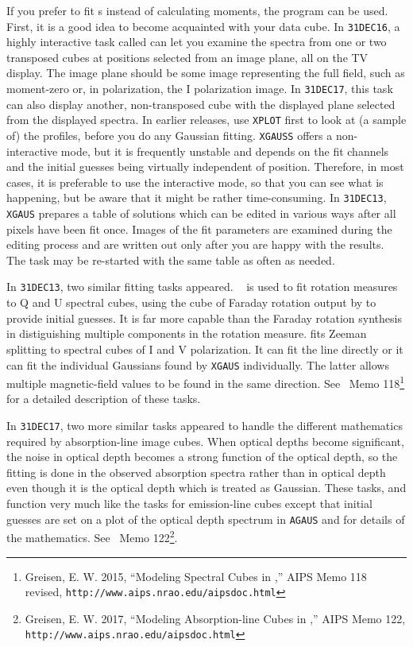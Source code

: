     If you prefer to fit s instead of calculating
moments, the program {\tt {}} can be used. First, it is a
good idea to become acquainted with your data cube.  In {\tt 31DEC16},
a highly interactive task called {\tt {}} can let you
examine the spectra from one or two transposed cubes at positions
selected from an image plane, all on the TV display.  The image plane
should be some image representing the full field, such as moment-zero
or, in polarization, the I polarization image.  In {\tt 31DEC17}, this
task can also display another, non-transposed cube with the displayed
plane selected from the displayed spectra.  In earlier releases, use
{\tt XPLOT} first to look at (a sample of) the profiles, before you do
any Gaussian fitting.  {\tt XGAUSS} offers a non-interactive mode, but
it is frequently unstable and depends on the fit channels and the
initial guesses being virtually independent of position.  Therefore,
in most cases, it is preferable to use the interactive mode, so that
you can see what is happening, but be aware that it might be rather
time-consuming.  In {\tt 31DEC13}, {\tt XGAUS} prepares
a table of solutions which can be edited in various ways after all
pixels have been fit once.  Images of the fit parameters are examined
during the editing process and are written out only after you are
happy with the results.  The task may be re-started with the same
table as often as needed.

     In {\tt 31DEC13}, two similar fitting tasks appeared.  {\tt
{}} is used to fit rotation measures to Q and U spectral
cubes, using the cube of Faraday rotation output by {\tt {}}
to provide initial guesses.  It is far more capable than the Faraday
rotation synthesis in distiguishing multiple components in the
rotation measure.  {\tt {}} fits Zeeman splitting to
spectral cubes of I and V polarization.  It can fit the line directly
or it can fit the individual Gaussians found by {\tt XGAUS}
individually.  The latter allows multiple magnetic-field values to be
found in the same direction.  See \AIPS\ Memo 118\footnote{Greisen, E.
W. 2015, ``Modeling Spectral Cubes in \AIPS,'' AIPS Memo 118 revised,
{\tt http://www.aips.nrao.edu/aipsdoc.html}} for a detailed
description of these tasks.

     In {\tt 31DEC17}, two more similar tasks appeared to handle the
different mathematics required by absorption-line image cubes.  When
optical depths become significant, the noise in optical depth becomes
a strong function of the optical depth, so the fitting is done in the
observed absorption spectra rather than in optical depth even though
it is the optical depth which is treated as Gaussian.  These tasks,
{\tt {}} and {\tt {}} function very much like the
tasks for emission-line cubes except that initial guesses are set on a
plot of the optical depth spectrum in {\tt AGAUS} and for details of
the mathematics.  See \AIPS\ Memo 122\footnote{Greisen, E. W. 2017,
``Modeling Absorption-line Cubes in \AIPS,'' AIPS Memo 122, {\tt
http://www.aips.nrao.edu/aipsdoc.html}}.

